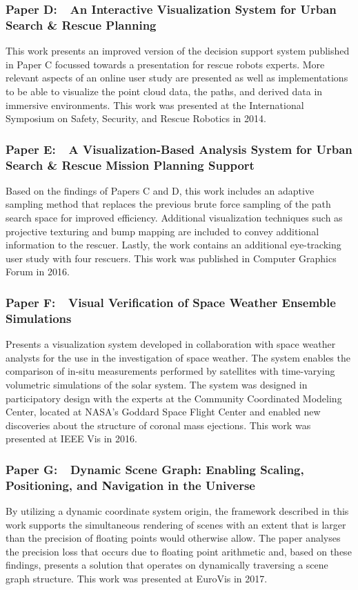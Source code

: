 \subsubsection{Paper D:~~An Interactive Visualization System for Urban Search \& Rescue Planning}
This work presents an improved version of the decision support system published in Paper C focussed towards a presentation for rescue robots experts.  More relevant aspects of an online user study are presented as well as implementations to be able to visualize the point cloud data, the paths, and derived data in immersive environments.  This work was presented at the International Symposium on Safety, Security, and Rescue Robotics in 2014.

\subsubsection{Paper E:~~A Visualization-Based Analysis System for Urban Search \& Rescue Mission Planning Support}
Based on the findings of Papers C and D, this work includes an adaptive sampling method that replaces the previous brute force sampling of the path search space for improved efficiency.  Additional visualization techniques such as projective texturing and bump mapping are included to convey additional information to the rescuer.  Lastly, the work contains an additional eye-tracking user study with four rescuers.  This work was published in Computer Graphics Forum in 2016.

\subsubsection{Paper F:~~Visual Verification of Space Weather Ensemble Simulations}
Presents a visualization system developed in collaboration with space weather analysts for the use in the investigation of space weather.  The system enables the comparison of in-situ measurements performed by satellites with time-varying volumetric simulations of the solar system.  The system was designed in participatory design with the experts at the Community Coordinated Modeling Center, located at NASA's Goddard Space Flight Center and enabled new discoveries about the structure of coronal mass ejections.  This work was presented at IEEE Vis in 2016.

\subsubsection{Paper G:~~Dynamic Scene Graph: Enabling Scaling, Positioning, and Navigation in the Universe}
By utilizing a dynamic coordinate system origin, the framework described in this work supports the simultaneous rendering of scenes with an extent that is larger than the precision of floating points would otherwise allow.  The paper analyses the precision loss that occurs due to floating point arithmetic and, based on these findings, presents a solution that operates on dynamically traversing a scene graph structure.  This work was presented at EuroVis in 2017.

